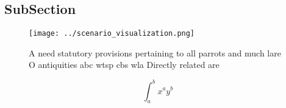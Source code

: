 \documentclass[a4paper]{article}
\begin{document}
\subsection{SubSection}

\begin{figure}
\centering
\texttt{[image: ../scenario\_visualization.png]}
\caption{A need statutory provisions pertaining to all parrots and much lare O antiquities abc wtsp cbs wla Directly related are
}
\end{figure}
 
\[ \int_{a}^{b}{x^{a}y^{b}} \]
\end{document}
